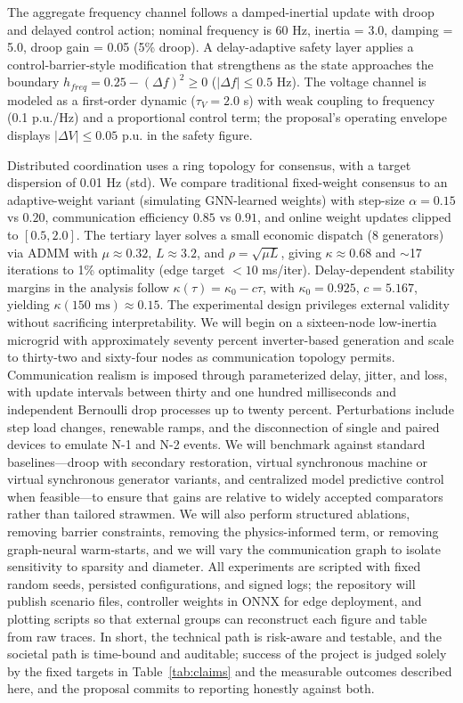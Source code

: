 \documentclass[12pt]{article}
\begin{document}
The aggregate frequency channel follows a damped-inertial update with droop and delayed control action; nominal frequency is 60 Hz, inertia = 3.0, damping = 5.0, droop gain = 0.05 (5\% droop). A delay-adaptive safety layer applies a control-barrier-style modification that strengthens as the state approaches the boundary $h_{freq} = 0.25 - (\Delta f)^2 \geq 0$ ($|\Delta f| \leq 0.5$ Hz). The voltage channel is modeled as a first-order dynamic ($\tau_V = 2.0$ s) with weak coupling to frequency (0.1 p.u./Hz) and a proportional control term; the proposal's operating envelope displays $|\Delta V| \leq 0.05$ p.u. in the safety figure.

Distributed coordination uses a ring topology for consensus, with a target dispersion of 0.01 Hz (std). We compare traditional fixed-weight consensus to an adaptive-weight variant (simulating GNN-learned weights) with step-size $\alpha = 0.15$ vs $0.20$, communication efficiency $0.85$ vs $0.91$, and online weight updates clipped to $[0.5, 2.0]$. The tertiary layer solves a small economic dispatch (8 generators) via ADMM with $\mu \approx 0.32$, $L \approx 3.2$, and $\rho = \sqrt{\mu L}$, giving $\kappa \approx 0.68$ and $\sim$17 iterations to 1\% optimality (edge target $< 10$ ms/iter). Delay-dependent stability margins in the analysis follow $\kappa(\tau) = \kappa_0 - c\tau$, with $\kappa_0 = 0.925$, $c = 5.167$, yielding $\kappa(150\text{ ms}) \approx 0.15$.
The experimental design privileges external validity without sacrificing interpretability. We will begin on a sixteen-node low-inertia microgrid with approximately seventy percent inverter-based generation and scale to thirty-two and sixty-four nodes as communication topology permits. Communication realism is imposed through parameterized delay, jitter, and loss, with update intervals between thirty and one hundred milliseconds and independent Bernoulli drop processes up to twenty percent. Perturbations include step load changes, renewable ramps, and the disconnection of single and paired devices to emulate N-1 and N-2 events. We will benchmark against standard baselines---droop with secondary restoration, virtual synchronous machine or virtual synchronous generator variants, and centralized model predictive control when feasible---to ensure that gains are relative to widely accepted comparators rather than tailored strawmen. We will also perform structured ablations, removing barrier constraints, removing the physics-informed term, or removing graph-neural warm-starts, and we will vary the communication graph to isolate sensitivity to sparsity and diameter. All experiments are scripted with fixed random seeds, persisted configurations, and signed logs; the repository will publish scenario files, controller weights in ONNX for edge deployment, and plotting scripts so that external groups can reconstruct each figure and table from raw traces. In short, the technical path is risk-aware and testable, and the societal path is time-bound and auditable; success of the project is judged solely by the fixed targets in Table~\ref{tab:claims} and the measurable outcomes described here, and the proposal commits to reporting honestly against both.
\end{document}

